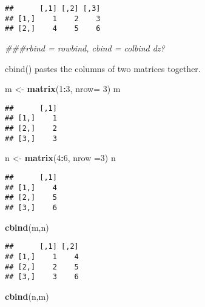 \documentclass[
]{article}
\newenvironment{Shaded}{\begin{snugshade}}{\end{snugshade}}
\newcommand{\CommentTok}[1]{\textcolor[rgb]{0.56,0.35,0.01}{\textit{#1}}}
\newcommand{\DataTypeTok}[1]{\textcolor[rgb]{0.13,0.29,0.53}{#1}}
\newcommand{\DecValTok}[1]{\textcolor[rgb]{0.00,0.00,0.81}{#1}}
\newcommand{\KeywordTok}[1]{\textcolor[rgb]{0.13,0.29,0.53}{\textbf{#1}}}
\newcommand{\NormalTok}[1]{#1}
\newcommand{\OperatorTok}[1]{\textcolor[rgb]{0.81,0.36,0.00}{\textbf{#1}}}
\newcommand{\StringTok}[1]{\textcolor[rgb]{0.31,0.60,0.02}{#1}}
\begin{document}
\begin{verbatim}
##      [,1] [,2] [,3]
## [1,]    1    2    3
## [2,]    4    5    6
\end{verbatim}

\begin{Shaded}
\begin{Highlighting}[]
\CommentTok{###rbind = rowbind, cbind = colbind dz?}
\end{Highlighting}
\end{Shaded}

cbind() pastes the columns of two matrices together.

\begin{Shaded}
\begin{Highlighting}[]
\NormalTok{m <-}\StringTok{ }\KeywordTok{matrix}\NormalTok{(}\DecValTok{1}\OperatorTok{:}\DecValTok{3}\NormalTok{, }\DataTypeTok{nrow=} \DecValTok{3}\NormalTok{)}
\NormalTok{m}
\end{Highlighting}
\end{Shaded}

\begin{verbatim}
##      [,1]
## [1,]    1
## [2,]    2
## [3,]    3
\end{verbatim}

\begin{Shaded}
\begin{Highlighting}[]
\NormalTok{n <-}\StringTok{ }\KeywordTok{matrix}\NormalTok{(}\DecValTok{4}\OperatorTok{:}\DecValTok{6}\NormalTok{, }\DataTypeTok{nrow =}\DecValTok{3}\NormalTok{)}
\NormalTok{n}
\end{Highlighting}
\end{Shaded}

\begin{verbatim}
##      [,1]
## [1,]    4
## [2,]    5
## [3,]    6
\end{verbatim}

\begin{Shaded}
\begin{Highlighting}[]
\KeywordTok{cbind}\NormalTok{(m,n)}
\end{Highlighting}
\end{Shaded}

\begin{verbatim}
##      [,1] [,2]
## [1,]    1    4
## [2,]    2    5
## [3,]    3    6
\end{verbatim}

\begin{Shaded}
\begin{Highlighting}[]
\KeywordTok{cbind}\NormalTok{(n,m)}
\end{Highlighting}
\end{Shaded}
\end{document}
